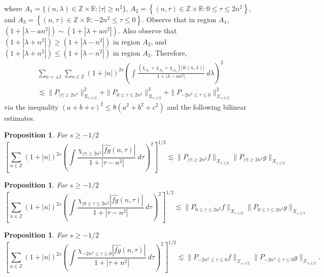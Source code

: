 \documentclass[12pt,reqno]{amsart}
\numberwithin{equation}{section}  %
\newcommand{\rr}{\mathbb{R}}
\newcommand{\zz}{\mathbb{Z}}
\newcommand{\zzdot}{\dot{\zz}}
\newcommand{\wh}{\widehat}
\newtheorem{proposition}[theorem]{Proposition}
\begin{document}
where $A_{1} = \{(n, \lambda) \in \zz \times \rr: | \tau | \ge n^{2} \}$, $A_{2} = \left \{ (n, \tau) \in \zz \times \rr: 0 \le \tau \le 2n^{2} \right \}$, and $A_{3} = \left \{ (n, \tau) \in \zz \times \rr: -2n^{2} \le \tau \le 0 \right \}$. Observe that in region $A_{1}$, $(1 + | \lambda - an^{2} |) \sim (1 + | \lambda + an^{2} |)$. Also observe that $(1 + | \lambda + n^{2} |) \ge (1 + | \lambda - n^{2} |)$ in region $A_{2}$, and $(1 + | \lambda + n^{2} |) \le (1 + | \lambda - n^{2} |)$ in region $A_{3}$. Therefore,
\begin{equation}
\begin{split}
& \sum_{a = \pm 1} \sum_{n \in \zzdot} \left (1 + |n| \right )^{2s}  \left ( \int
		\frac{(\chi_{A_{1}} + \chi_{A_{2}}+ \chi_{A_{3}})|\wh{w}(n, \lambda) |}{1 + |\lambda - an^{2}|}
		\ d\lambda \right )^2
		\\
		& \lesssim \| P_{| \tau | \ge 2n^	2} \|_{X_{s,1/2}}^{2} + \| P_{0 \le  \tau  \le 2n^	2} \|_{X_{s,1/2}}^{2} + \| P_{-2n^{2} \le  \tau \le 0} \|_{\mathcal{X}_{s,1/2}}^{2}
		\end{split}
		\end{equation}
		via the inequality $(a + b + c)^{2} \le 8(a^{2} + b^{2} +
		c^{2})$ and the following bilinear estimates.
		\begin{proposition}
\label{prop:bilin-1-endpoint}
		For $s \ge -1/2$
		\begin{equation}
		\left [ \sum_{n \in \zz} \left (1 + |n| \right )^{2s}  \left ( \int
		\frac{\chi_{| \tau | \ge 2n^{2}}|\wh{fg}(n, \tau) |}{1 + |\tau - n^{2}|}
		\ d\tau \right )^2 \right ]^{1/2} \lesssim \| P_{| \tau | \ge 2n^{2}} f \|_{X_{s,1/2}}\| P_{| \tau | \ge 2n^{2}} g \|_{X_{s,1/2}}
		\end{equation}
				\end{proposition}
		\begin{proposition}
		\label{prop:bilin-2-endpoint}
		For $s \ge -1/2$
		\begin{equation}
		\left [ \sum_{n \in \zz} \left (1 + |n| \right )^{2s}  \left ( \int
		\frac{\chi_{| 0 \le \tau  \le 2n^{2}}|\wh{fg}(n, \tau) |}{1 + |\tau - n^{2}|}
		\ d\tau \right )^2 \right ]^{1/2} \lesssim \| P_{0 \le \tau \le 2n^{2}} f \|_{X_{s,1/2}}\| P_{0 \le  \tau \le 2n^{2}} g \|_{X_{s,1/2}}
		\end{equation}
		\end{proposition}
\begin{proposition}
		\label{prop:bilin-3-endpoint}
		For $s \ge -1/2$
		\begin{equation}
		\left [ \sum_{n \in \zz} \left (1 + |n| \right )^{2s}  \left ( \int
		\frac{\chi_{-2n^{2} \le  \tau \le 0}|\wh{fg}(n, \tau) |}{1 + |\tau + n^{2}|}
		\ d\tau \right )^2 \right ]^{1/2} \lesssim \| P_{-2n^{2} \le \tau \le 0} f \|_{\mathcal{X}_{s,1/2}}\| P_{-2n^{2} \le  \tau  \le 0} g \|_{\mathcal{X}_{s,1/2}}.
		\end{equation}
		\end{proposition}
\end{document}
